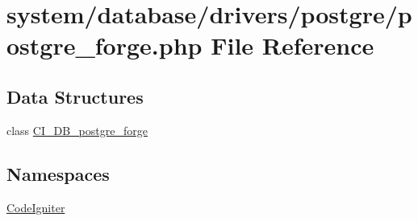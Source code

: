 \hypertarget{postgre__forge_8php}{\section{system/database/drivers/postgre/postgre\-\_\-forge.php File Reference}
\label{postgre__forge_8php}
}
\subsection*{Data Structures}
\begin{DoxyCompactItemize}
\item 
class \hyperlink{class_c_i___d_b__postgre__forge}{C\-I\-\_\-\-D\-B\-\_\-postgre\-\_\-forge}
\end{DoxyCompactItemize}
\subsection*{Namespaces}
\begin{DoxyCompactItemize}
\item 
\hyperlink{namespace_code_igniter}{Code\-Igniter}
\end{DoxyCompactItemize}
